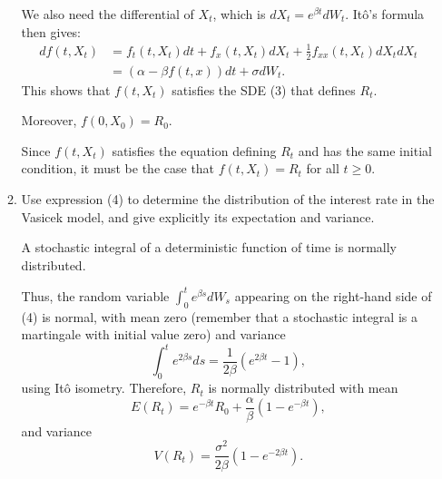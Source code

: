 \documentclass[handout,8pt]{beamer}
\begin{document}
\begin{frame}[allowframebreaks]{ }
\begin{enumerate}
\begin{enumerate}
        \vspace*{1cm}
        
        We also need the differential of $X_t$, which is $dX_t = e^{\beta t} dW_t$. Itô's formula then gives:
        \begin{align*}
            df(t,X_t) &= f_t(t,X_t) dt + f_x(t,X_t) dX_t + \frac{1}{2}f_{xx}(t,X_t) dX_t dX_t\\
            &= (\alpha-\beta f(t,x)) dt + \sigma dW_t.
        \end{align*}
        This shows that $f(t,X_t)$ satisfies the SDE (3) that defines $R_t$. \newline
        
        Moreover, $f(0,X_0)=R_0$. \newline
        
        Since $f(t,X_t)$ satisfies the equation defining $R_t$ and has the same initial condition, it must be the case that $f(t,X_t) = R_t$ for all $t\geq 0$. \newline
        
        \newpage 
        
        
        \item Use expression (4) to determine the distribution of the interest rate in the Vasicek model, and give explicitly its expectation and variance.\newline
        
        A stochastic integral of a deterministic function of time is normally distributed. \newline
        
        Thus, the random variable $\int_0^t e^{\beta s} dW_s$ appearing on the right-hand side of (4) is normal, with mean zero (remember that a stochastic integral is a martingale with initial value zero) and variance
        \begin{equation*}
            \int_0^t e^{2\beta s} ds = \frac{1}{2\beta}(e^{2\beta t}-1),
        \end{equation*}
        using Itô isometry. Therefore, $R_t$ is normally distributed with mean
        \begin{equation*}
            E(R_t) = e^{-\beta t}R_0 + \frac{\alpha}{\beta}(1-e^{-\beta t}),
        \end{equation*}
        and variance
        \begin{equation*}
            V(R_t) = \frac{\sigma^2}{2\beta}(1-e^{-2\beta t}).
        \end{equation*}
        

\end{enumerate}
\end{enumerate}
\end{frame}
\end{document}
